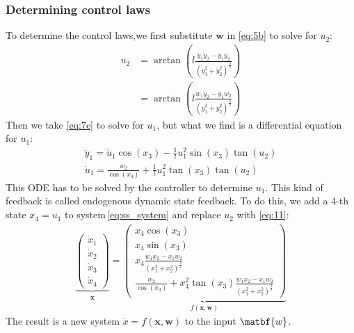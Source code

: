 \documentclass[a4paper,11pt,headings=standardclasses,parskip=half]{scrartcl}
\newcommand{\x}{\mathbf{x}}
\begin{document}
\subsubsection{Determining control laws}
To determine the control laws,we first substitute $\mathbf{w}$ in \eqref{eq:5b} to solve for $u_2$:
\begin{subequations}
\label{eq:11}
\begin{align}
u_2 &= \arctan\left(l \frac{\ddot{y}_1 \dot{y}_2 - \dot{y}_1 \ddot{y}_2}{(\dot{y}_1^2+\dot{y}_2^2)^{\frac{3}{2}}} 
\right) \\
&= \arctan\left(l \frac{w_1 \dot{y}_2 - \dot{y}_1 w_2}{(\dot{y}_1^2+\dot{y}_2^2)^{\frac{3}{2}}} 
\right) 
\end{align}
\end{subequations} 
Then we take \eqref{eq:7e} to solve for $u_1$, but what we find is a differential equation for $u_1$:
\begin{subequations}
\begin{align}
\ddot{y}_1 = \dot{u}_1 \cos(x_3) - \frac{1}{l}u_1^2\sin(x_3)\tan(u_2) \\
\dot{u}_1 = \frac{w_2}{\cos(x_3)} + \frac{1}{l}u_1^2\tan(x_3)\tan(u_2)
\end{align}
\end{subequations}
This ODE  has to be solved by the controller to determine $u_1$. This kind of feedback is called endogenous dynamic state feedback. To do this, we add a 4-th state $x_4 = u_1$ to system\,\eqref{eq:ss_system} and replace $u_2$ with \eqref{eq:11}:
\begin{align}
\underbrace{\begin{pmatrix} \dot{x}_1 \\ \dot{x}_2 \\ \dot{x}_3 \\ \dot{x}_4\end{pmatrix}}_{\dot{\x}} = \underbrace{\begin{pmatrix}  x_4 \cos(x_3) \\ x_4 \sin(x_3) \\ x_4 \frac{w_1 x_2 - x_1 w_2}{(x_1^2+x_2^2)^{\frac{3}{2}}} \\ \frac{w_2}{\cos(x_3)} + x_4^2\tan(x_3) \frac{w_1 x_2 - x_1 w_2}{(x_1^2+x_2^2)^{\frac{3}{2}}}\end{pmatrix}}_{f(\x,\mathbf{w})}
\end{align}
The result is a new system $\dot{x}=f(\x,\mathbf{w})$ to the input $\matbf{w}$.
\end{document}
